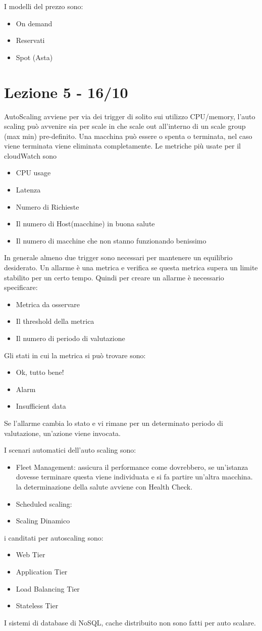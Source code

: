 \documentclass[11pt, twocolumn]{article}
\begin{document}
I modelli del prezzo sono:
\begin{itemize}
	\item On demand
	\item Reservati
	\item Spot (Asta)
\end{itemize}

\section{Lezione 5 - 16/10}
AutoScaling avviene per via dei trigger di solito sui utilizzo CPU/memory, l'auto scaling può avvenire sia per scale in che scale out all'interno di un scale group (max min) pre-definito. Una macchina può essere o spenta o terminata, nel caso viene terminata viene eliminata completamente.
Le metriche più usate per il cloudWatch sono
\begin{itemize}
	\item CPU usage
	\item Latenza
	\item Numero di Richieste
	\item Il numero di Host(macchine) in buona salute
	\item Il numero di macchine che non stanno funzionando benissimo
\end{itemize}
In generale almeno due trigger sono necessari per mantenere un equilibrio desiderato.
Un allarme è una metrica e verifica se questa metrica supera un limite stabilito per un certo tempo.
Quindi per creare un allarme è necessario specificare:
\begin{itemize}
	\item Metrica da osservare
	\item Il threshold della metrica
	\item Il numero di periodo di valutazione
\end{itemize}
Gli stati in cui la metrica si può trovare sono:
\begin{itemize}
	\item Ok, tutto bene!
	\item Alarm
	\item Insufficient data
\end{itemize}
Se l'allarme cambia lo stato e vi rimane per un determinato periodo di valutazione, un'azione viene invocata.

I scenari automatici dell'auto scaling sono:
\begin{itemize}
	\item Fleet Management: assicura il performance come dovrebbero, se un'istanza dovesse terminare questa viene individuata e si fa partire un'altra macchina. la determinazione della salute avviene con Health Check.
	\item Scheduled scaling: 
	\item Scaling Dinamico
\end{itemize}




i canditati per autoscaling sono:
\begin{itemize}
	\item Web Tier
	\item Application Tier
	\item Load Balancing Tier
	\item Stateless Tier
\end{itemize}

I sistemi di database di NoSQL, cache distribuito non sono fatti per auto scalare.
\end{document}
